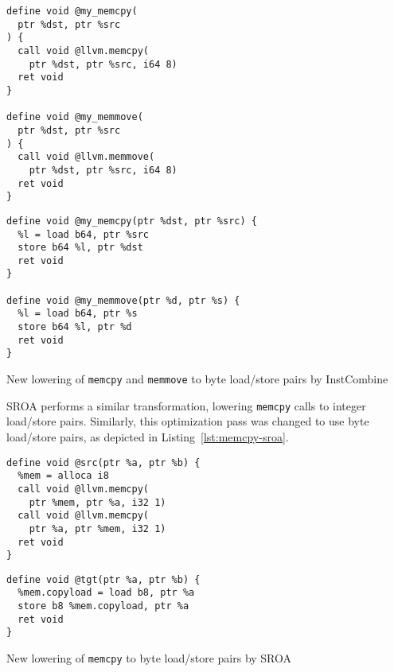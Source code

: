 \documentclass[a4paper,12pt]{article}
\begin{document}
\begin{listing}[h]
  \begin{minipage}{0.42\textwidth}
    \begin{verbatim}
define void @my_memcpy(
  ptr %dst, ptr %src
) {
  call void @llvm.memcpy(
    ptr %dst, ptr %src, i64 8)
  ret void
}

define void @my_memmove(
  ptr %dst, ptr %src
) {
  call void @llvm.memmove(
    ptr %dst, ptr %src, i64 8)
  ret void
}
    \end{verbatim}
  \end{minipage}
  \begin{minipage}{0.45\textwidth}
    \begin{verbatim}
define void @my_memcpy(ptr %dst, ptr %src) {
  %l = load b64, ptr %src
  store b64 %l, ptr %dst
  ret void
}

define void @my_memmove(ptr %d, ptr %s) {
  %l = load b64, ptr %s
  store b64 %l, ptr %d
  ret void
}
    \end{verbatim}
  \end{minipage}
  \caption{New lowering of \texttt{memcpy} and \texttt{memmove} to byte load/store pairs by InstCombine}
  \label{lst:memcpy-instcombine}
\end{listing}

SROA performs a similar transformation, lowering \texttt{memcpy} calls to integer load/store pairs.
Similarly, this optimization pass was changed to use byte load/store pairs, as depicted in Listing~\ref{lst:memcpy-sroa}.

\begin{listing}[h]
  \begin{minipage}{0.45\textwidth}
    \begin{verbatim}
define void @src(ptr %a, ptr %b) {
  %mem = alloca i8
  call void @llvm.memcpy(
    ptr %mem, ptr %a, i32 1)
  call void @llvm.memcpy(
    ptr %a, ptr %mem, i32 1)
  ret void
}
    \end{verbatim}
  \end{minipage}
  \begin{minipage}{0.45\textwidth}
    \begin{verbatim}
define void @tgt(ptr %a, ptr %b) {
  %mem.copyload = load b8, ptr %a
  store b8 %mem.copyload, ptr %a
  ret void
}
    \end{verbatim}
  \end{minipage}
  \caption{New lowering of \texttt{memcpy} to byte load/store pairs by SROA}
  \label{lst:memcpy-sroa}
\end{listing}
\end{document}
